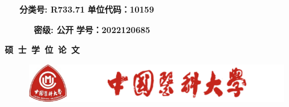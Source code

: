 
\begin{titlepage}
\begin{center}
   
    \hei \fontsize{10.5pt}{13pt}\selectfont
    {\bf ~~~分类号: R733.71} \hskip 2.85in {\bf 单位代码：10159}
\end{center}
\begin{center}
    \vspace{-.5cm}
    \hei \fontsize{10.5pt}{13pt}\selectfont
    {\bf ~~~~~~密级: 公开}  \hskip 3.3in {\bf 学号：2022120685}
\end{center}

\begin{center}
    \vspace{0.8cm}
     \zhongsong\fontsize{36pt}{13pt}\selectfont
    {\bfseries 硕~士~学~位~论~文}
\end{center}

\begin{center}
\begin{figure}[htbp]
	\centering
         \hskip 1.5cm
	\includegraphics[width=4.3 in,height=0.7 in]{Img/cmulogo.png}
\end{figure}
\end{center}





\end{titlepage}
